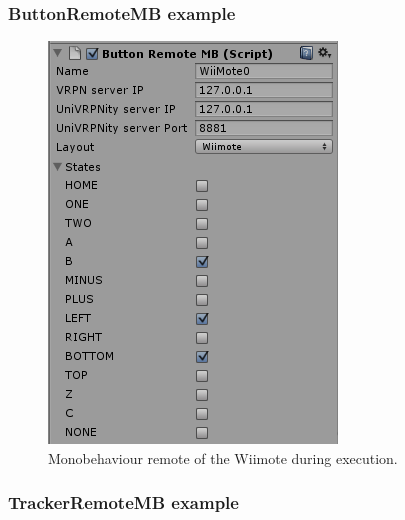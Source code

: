 \documentclass[11pt]{article} %
\begin{document}
		\subsubsection{ButtonRemoteMB example}

			\begin{figure}[H]
				\includegraphics{ButtonWiimote.png}
				\caption{Monobehaviour remote of the Wiimote during execution.}
			\end{figure}


		\subsubsection{TrackerRemoteMB example}
\end{document}
